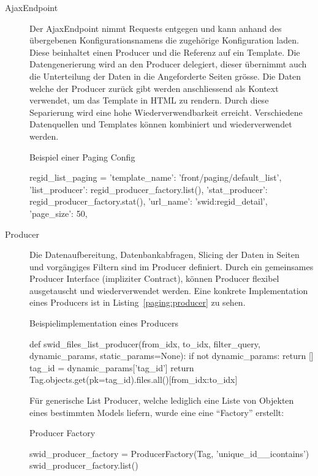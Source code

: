 \begin{description}
	\item [AjaxEndpoint] Der AjaxEndpoint nimmt Requests entgegen und kann anhand
	des übergebenen Konfigurationsnamens die zugehörige Konfiguration laden. Diese
	beinhaltet einen Producer und die Referenz auf ein Template. Die
	Datengenerierung wird an den Producer delegiert, dieser übernimmt auch die
	Unterteilung der Daten in die Angeforderte  Seiten grösse. Die Daten welche der
	Producer zurück gibt werden anschliessend als Kontext verwendet, um das
	Template in HTML zu rendern. Durch diese Separierung wird eine hohe
	Wiederverwendbarkeit erreicht. Verschiedene Datenquellen und Templates können
	kombiniert und wiederverwendet werden.
\begin{listing}
\caption{Beispiel einer Paging Config}
\begin{pythoncode}
regid_list_paging = {
    'template_name': 'front/paging/default_list',
    'list_producer': regid_producer_factory.list(),
    'stat_producer': regid_producer_factory.stat(),
    'url_name': 'swid:regid_detail',
    'page_size': 50,
}
\end{pythoncode}
\end{listing}

	\item[Producer] Die Datenaufbereitung, Datenbankabfragen, Slicing der Daten in
	Seiten und vorgängiges Filtern sind im Producer definiert. Durch ein
	gemeinsames Producer Interface (impliziter Contract\cite{contracts:2003}),
	können Producer flexibel ausgetauscht und wiederverwendet werden. Eine konkrete
	Implementation eines Producers ist in Listing~\ref{paging:producer} zu sehen.
	
\begin{listing}
\caption{Beispielimplementation eines Producers}
\label{paging:producer}
\begin{pythoncode}
def swid_files_list_producer(from_idx, to_idx, filter_query, dynamic_params, static_params=None):
 if not dynamic_params:
     return []
 tag_id = dynamic_params['tag_id']
 return Tag.objects.get(pk=tag_id).files.all()[from_idx:to_idx]
\end{pythoncode}
\end{listing}
	
	Für generische List Producer, welche lediglich eine Liste von Objekten eines
	bestimmten Models liefern, wurde eine eine \enquote{Factory} erstellt:
	
\begin{listing}
\caption{Producer Factory}
\begin{pythoncode}
swid_producer_factory = ProducerFactory(Tag, 'unique_id__icontains')
swid_producer_factory.list()
\end{pythoncode}
\end{listing}
	

\end{description}

